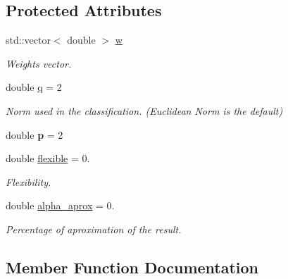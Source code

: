 \subsection*{Protected Attributes}
\begin{DoxyCompactItemize}
\item 
\mbox{\label{class_primal_classifier_ad6ad165a5ad305841797374de9fc2aac}} 
std\+::vector$<$ double $>$ \hyperlink{class_primal_classifier_ad6ad165a5ad305841797374de9fc2aac}{w}
\begin{DoxyCompactList}\small\item\em Weights vector. \end{DoxyCompactList}\item 
\mbox{\label{class_primal_classifier_a746ad2ff93fb77d82ae389f90dbdc89e}} 
double \hyperlink{class_primal_classifier_a746ad2ff93fb77d82ae389f90dbdc89e}{q} = 2
\begin{DoxyCompactList}\small\item\em Norm used in the classification. (Euclidean Norm is the default) \end{DoxyCompactList}\item 
\mbox{\label{class_primal_classifier_abc5cd90a024d5acfe49ae8ea787204c9}} 
double {\bfseries p} = 2
\item 
\mbox{\label{class_primal_classifier_af660bbc42f67792e3da8876671b1e9df}} 
double \hyperlink{class_primal_classifier_af660bbc42f67792e3da8876671b1e9df}{flexible} = 0.
\begin{DoxyCompactList}\small\item\em Flexibility. \end{DoxyCompactList}\item 
\mbox{\label{class_primal_classifier_a1a432d06373100e176e116f995bdcd26}} 
double \hyperlink{class_primal_classifier_a1a432d06373100e176e116f995bdcd26}{alpha\+\_\+aprox} = 0.
\begin{DoxyCompactList}\small\item\em Percentage of aproximation of the result. \end{DoxyCompactList}\end{DoxyCompactItemize}


\subsection{Member Function Documentation}
\mbox{\label{class_primal_classifier_af5117ae286ed7f06430b98f433e9bf62}} 
